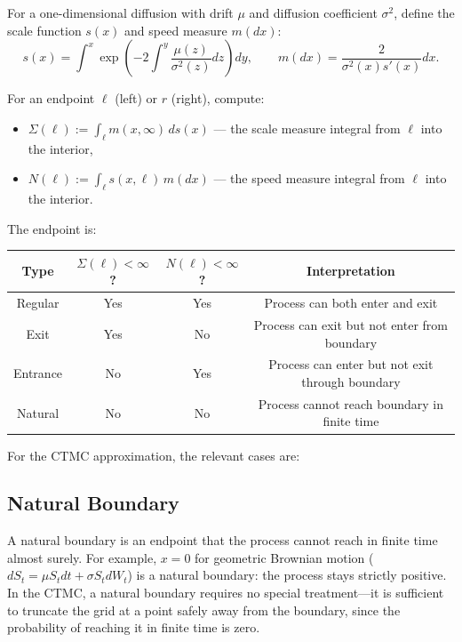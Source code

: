\documentclass[11pt,a4paper,openany]{book}
\theoremstyle{definition}
\theoremstyle{plain}
\theoremstyle{remark}
\newcommand{\1}{\mathbbm{1}}
\begin{document}
For a one-dimensional diffusion with drift $\mu$ and diffusion coefficient $\sigma^{2}$, define the scale function $s(x)$ and speed measure $m(dx)$:
\[
s(x) = \int^{x} \exp\left(-2\int^{y} \frac{\mu(z)}{\sigma^{2}(z)} dz\right) dy, \qquad
m(dx) = \frac{2}{\sigma^{2}(x) s'(x)} dx.
\]

For an endpoint $\ell$ (left) or $r$ (right), compute:
\begin{itemize}
    \item $\Sigma(\ell) := \int_{\ell} m(x,\infty) \, ds(x)$ --- the scale measure integral from $\ell$ into the interior,
    \item $N(\ell) := \int_{\ell} s(x,\ell) \, m(dx)$ --- the speed measure integral from $\ell$ into the interior.
\end{itemize}
The endpoint is:
\begin{center}
\begin{tabular}{c|c|c|c}
\toprule
\textbf{Type} & $\Sigma(\ell) < \infty$? & $N(\ell) < \infty$? & \textbf{Interpretation} \\
\midrule
Regular & Yes & Yes & Process can both enter and exit \\
Exit & Yes & No & Process can exit but not enter from boundary \\
Entrance & No & Yes & Process can enter but not exit through boundary \\
Natural & No & No & Process cannot reach boundary in finite time \\
\bottomrule
\end{tabular}
\end{center}

For the CTMC approximation, the relevant cases are:

\subsection{Natural Boundary}

A natural boundary is an endpoint that the process cannot reach in finite time almost surely. For example, $x=0$ for geometric Brownian motion ($dS_{t} = \mu S_{t} dt + \sigma S_{t} dW_{t}$) is a natural boundary: the process stays strictly positive. In the CTMC, a natural boundary requires no special treatment---it is sufficient to truncate the grid at a point safely away from the boundary, since the probability of reaching it in finite time is zero.
\end{document}
